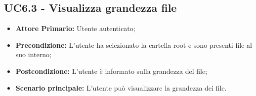 \subsection{UC6.3 - Visualizza grandezza file}
\begin{itemize}
\item \textbf{Attore Primario:} Utente autenticato;
\item \textbf{Precondizione:} L'utente ha selezionato la cartella root e sono presenti file al suo interno;
\item \textbf{Postcondizione:} L'utente è informato sulla grandezza del file;
\item \textbf{Scenario principale:} L'utente può visualizzare la grandezza dei file.
\end{itemize}